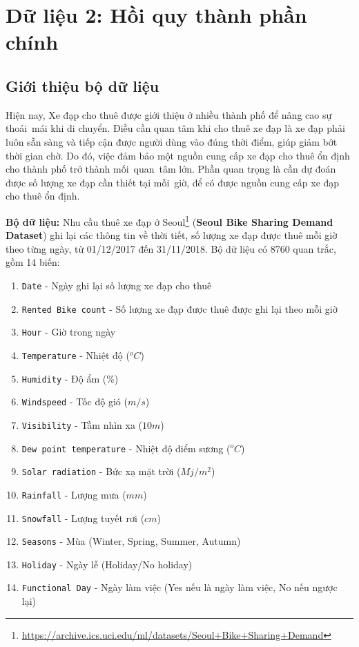 \section{Dữ liệu 2: Hồi quy thành phần chính}

\subsection*{Giới thiệu bộ dữ liệu}
Hiện nay, Xe đạp cho thuê được giới thiệu ở nhiều thành phố để nâng cao sự thoải~mái khi di chuyển. Điều cần quan tâm khi cho thuê xe đạp là xe đạp phải luôn sẵn sàng và tiếp cận được người dùng vào đúng thời điểm, giúp giảm bớt thời gian chờ. Do đó, việc đảm bảo một nguồn cung cấp xe đạp cho thuê ổn định cho thành phố trở thành mối~quan~tâm lớn. Phần quan trọng là cần dự đoán được số lượng xe đạp cần thiết tại mỗi~giờ, để có được nguồn cung cấp xe đạp cho thuê ổn định.

\textbf{Bộ dữ liệu:} Nhu cầu thuê xe đạp ở Seoul\footnote{\url{https://archive.ics.uci.edu/ml/datasets/Seoul+Bike+Sharing+Demand}} (\textbf{Seoul Bike Sharing Demand Dataset}) ghi lại các thông tin về thời tiết, số lượng xe đạp được thuê mỗi giờ theo từng ngày, từ 01/12/2017 đến 31/11/2018. Bộ dữ liệu có 8760 quan trắc, gồm 14 biến:
\begin{enumerate}
	\item \texttt{Date} - Ngày ghi lại số lượng xe đạp cho thuê
	\item \texttt{Rented Bike count} - Số lượng xe đạp được thuê được ghi lại theo mỗi giờ
	\item \texttt{Hour} - Giờ trong ngày
	\item \texttt{Temperature} - Nhiệt độ ($^o C$)
	\item \texttt{Humidity} - Độ ẩm (\%)
	\item \texttt{Windspeed} - Tốc độ gió ($m/s$)
	\item \texttt{Visibility} - Tầm nhìn xa ($10m$)
	\item \texttt{Dew point temperature} - Nhiệt độ điểm sương ($^o C$)
	\item \texttt{Solar radiation} - Bức xạ mặt trời ($Mj/m^2$)
	\item \texttt{Rainfall} - Lượng mưa ($mm$)
	\item \texttt{Snowfall} - Lượng tuyết rơi ($cm$)
	\item \texttt{Seasons} - Mùa (Winter, Spring, Summer, Autumn)
	\item \texttt{Holiday} - Ngày lễ (Holiday/No holiday)
	\item \texttt{Functional Day} - Ngày làm việc (Yes nếu là ngày làm việc, No nếu ngược lại)
\end{enumerate}

